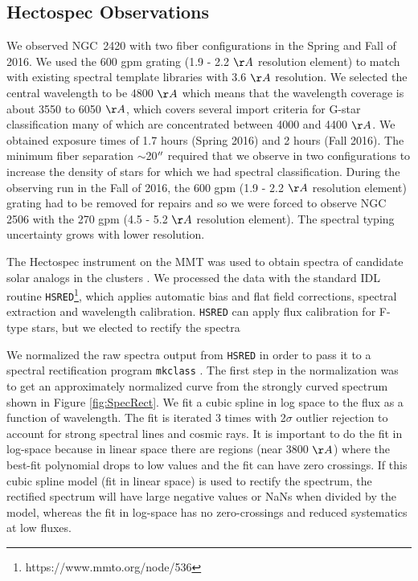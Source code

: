 \documentclass{aastex6}
\begin{document}
\subsection{Hectospec Observations}
We observed NGC~2420 with two fiber configurations in the Spring and Fall of 2016.
We used the 600 gpm grating (1.9 - 2.2 $\AA$ resolution element) to match with existing spectral template libraries with 3.6 $\AA$ resolution.
We selected the central wavelength to be 4800 $\AA$ which means that the wavelength coverage is about 3550 to 6050 $\AA$, which covers several import criteria for G-star classification many of which are concentrated between 4000 and 4400 $\AA$.
We obtained exposure times of 1.7 hours (Spring 2016) and 2 hours (Fall 2016).
The minimum fiber separation $\sim$20$\mbox{$^{\prime\prime}$}$ required that we observe in two configurations to increase the density of stars for which we had spectral classification.
During the observing run in the Fall of 2016, the 600 gpm (1.9 - 2.2 $\AA$ resolution element) grating had to be removed for repairs and so we were forced to observe NGC 2506 with the 270 gpm (4.5 - 5.2 $\AA$ resolution element).
The spectral typing uncertainty grows with lower resolution.

The Hectospec instrument on the MMT \citep{fabricant2005hectospec,mink2007hectoFibers} was used to obtain spectra of candidate solar analogs in the clusters .
We processed the data with the standard IDL routine \texttt{HSRED}\footnote{https://www.mmto.org/node/536}, which applies automatic bias and flat field corrections, spectral extraction and wavelength calibration.
\texttt{HSRED} can apply flux calibration for F-type stars, but we elected to rectify the spectra 

We normalized the raw spectra output from \texttt{HSRED} in order to pass it to a spectral rectification program \texttt{mkclass} \citep{gray2014classification}.
The first step in the normalization was to get an approximately normalized curve from the strongly curved spectrum shown in Figure \ref{fig:SpecRect}.
We fit a cubic spline in log space to the flux as a function of wavelength.
The fit is iterated 3 times with 2$\sigma$ outlier rejection to account for strong spectral lines and cosmic rays.
It is important to do the fit in log-space because in linear space there are regions (near 3800 $\AA$) where the best-fit polynomial drops to low values and the fit can have zero crossings.
If this cubic spline model (fit in linear space) is used to rectify the spectrum, the rectified spectrum will have large negative values or NaNs when divided by the model, whereas the fit in log-space has no zero-crossings and reduced systematics at low fluxes.
\end{document}
